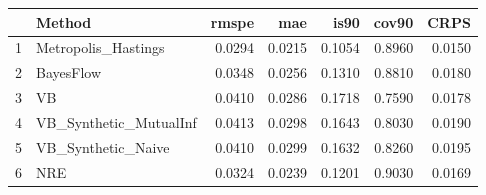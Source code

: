 \documentclass[12pt]{article}
\begin{document}
\thispagestyle{empty}
\begin{table}[ht]
\centering
\begin{tabular}{rlrrrrr}
  \hline
 & Method & rmspe & mae & is90 & cov90 & CRPS \\ 
  \hline
1 & Metropolis\_Hastings & 0.0294 & 0.0215 & 0.1054 & 0.8960 & 0.0150 \\ 
  2 & BayesFlow & 0.0348 & 0.0256 & 0.1310 & 0.8810 & 0.0180 \\ 
  3 & VB & 0.0410 & 0.0286 & 0.1718 & 0.7590 & 0.0178 \\ 
  4 & VB\_Synthetic\_MutualInf & 0.0413 & 0.0298 & 0.1643 & 0.8030 & 0.0190 \\ 
  5 & VB\_Synthetic\_Naive & 0.0410 & 0.0299 & 0.1632 & 0.8260 & 0.0195 \\ 
  6 & NRE & 0.0324 & 0.0239 & 0.1201 & 0.9030 & 0.0169 \\ 
   \hline
\end{tabular}
\end{table}
\end{document}
